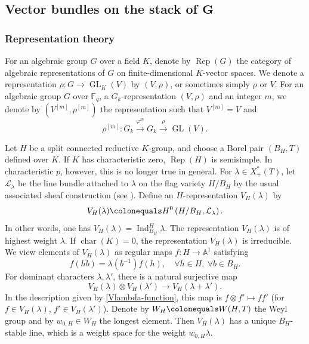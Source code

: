 \documentclass[10pt,a4paper]{article}
\numberwithin{equation}{section}
\theoremstyle{definition}
\theoremstyle{remark}
\newcommand{\Lcal}{{\mathcal L}}
\renewcommand{\AA}{\mathbb{A}}
\newcommand{\FF}{\mathbb{F}}
\DeclareMathOperator{\Rep}{Rep}
\DeclareMathOperator{\GL}{GL}
\DeclareMathOperator{\Ind}{Ind}
\DeclareMathOperator{\cara}{char}
\newcommand{\lra}{\longrightarrow}
\begin{document}
\subsection{Vector bundles on the stack of $\boldsymbol{G}$} \label{sec-vector-bundles-gzipz}

\subsubsection{Representation theory}\label{subsec-remind}

For an algebraic group $G$ over a field $K$, denote by $\Rep(G)$ the category of algebraic representations of $G$ on finite-dimensional $K$-vector spaces. We denote a representation $\rho\colon G\to \GL_K(V)$ by $(V,\rho)$, or sometimes simply $\rho$ or $V$. For an algebraic group $G$ over $\FF_q$, a $G_k$-representation $(V,\rho)$ and an integer $m$, we denote by $(V^{[m]},\rho^{[m]})$ the representation such that $V^{[m]}=V$ and
\begin{equation}\label{equ-rhom}
  \rho^{[m]} \colon  G_k \xrightarrow{\varphi^m} G_k \overset{\rho}\lra \GL(V).
\end{equation}

Let $H$ be a split connected reductive $K$-group, and choose a Borel pair $(B_H,T)$ defined over $K$. If $K$ has characteristic zero, $\Rep(H)$ is semisimple. In characteristic $p$, however, this is no longer true in general. For $\lambda\in X_{+}^*(T)$, let $\Lcal_\lambda$ be the line bundle attached to $\lambda$ on the flag variety $H/B_H$ by the usual associated sheaf construction (see \cite[Section~5.8]{jantzen-representations}). Define an $H$-representation $V_H(\lambda)$ by
\begin{equation}\label{VlambdadefH}
    V_H(\lambda) \colonequals H^0\left(H/B_H,\Lcal_\lambda\right) . 
\end{equation}
In other words, one has $V_H(\lambda)=\Ind_{B_H}^{H} \lambda$. The representation $V_H(\lambda)$ is of highest weight $\lambda$. If $\cara(K)=0$, the representation $V_H(\lambda)$ is irreducible. We view elements of $V_H(\lambda)$ as regular maps $f \colon H\to \AA^1$ satisfying
\begin{equation}\label{Vlambda-function}
f(hb)=\lambda\left(b^{-1}\right)f(h), \quad \forall h\in H, \ \forall b\in B_H.    
\end{equation}
For dominant characters $\lambda,\lambda'$, there is a natural surjective map
\begin{equation}\label{Vlambda-natural-map}
V_H(\lambda)\otimes V_H(\lambda')\lra V_H(\lambda+\lambda').
\end{equation}
In the description given by \eqref{Vlambda-function}, this map is $f\otimes f'\mapsto ff'$ (for $f\in V_H(\lambda)$, $f'\in V_H(\lambda')$). Denote by $W_H \colonequals W(H,T)$ the Weyl group and by $w_{0,H}\in W_H$ the longest element. Then $V_H(\lambda)$ has a unique $B_H$-stable line, which is a weight space for the weight $w_{0,H}\lambda$. 
\end{document}
